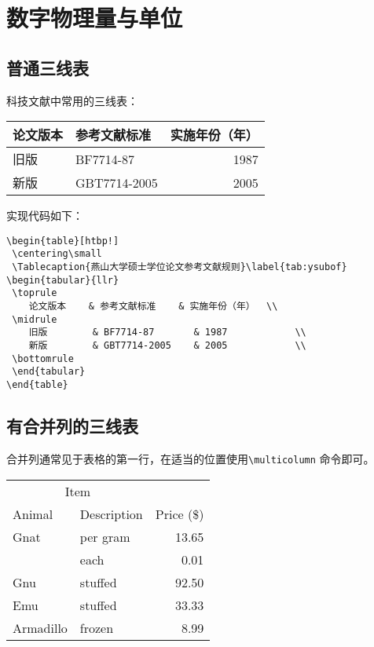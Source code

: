 ﻿%
\chapter{数字物理量与单位}
\label{chap:table}

\section{普通三线表}\label{section3-1}
科技文献中常用的三线表：
\begin{table}[htbp!]
 \centering\small
 \label{tab:ysubof}
\begin{tabular}{llr}
 \toprule
    论文版本    & 参考文献标准    & 实施年份（年）  \\
 \midrule
    旧版        & BF7714-87       & 1987            \\
    新版        & GBT7714-2005    & 2005            \\
 \bottomrule
 \end{tabular}
\end{table}

实现代码如下：
\begin{verbatim}
\begin{table}[htbp!]
 \centering\small
 \Tablecaption{燕山大学硕士学位论文参考文献规则}\label{tab:ysubof}
\begin{tabular}{llr}
 \toprule
    论文版本    & 参考文献标准    & 实施年份（年）  \\
 \midrule
    旧版        & BF7714-87       & 1987            \\
    新版        & GBT7714-2005    & 2005            \\
 \bottomrule
 \end{tabular}
\end{table}
\end{verbatim}

\section{有合并列的三线表}\label{section3-2}
合并列通常见于表格的第一行，在适当的位置使用\verb|\multicolumn| 命令即可。
\begin{table}[htbp!]
\centering\small
{}\label{tab:test}
\begin{tabular}{llr} \toprule
\multicolumn{2}{c}{Item} \\ \cmidrule(r){1-2}
Animal & Description & Price (\$)\\ \midrule
Gnat & per gram & 13.65 \\
& each & 0.01 \\
Gnu & stuffed & 92.50 \\
Emu & stuffed & 33.33 \\
Armadillo & frozen & 8.99 \\ \bottomrule
\end{tabular}
\end{table}


